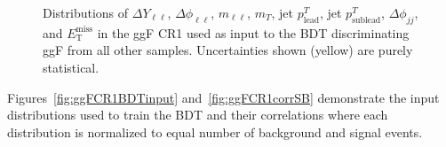 \begin{figure}[!h]
{  }\hfill
  \hfill
{\caption{Distributions of $\Delta Y_{\ell\ell}$, $\Delta \phi_{\ell\ell}$, $m_{\ell\ell}$, $m_T$, jet $p^T_{\text{lead}}$, jet $p^T_{\text{sublead}}$, $\Delta \phi_{jj}$, and $\ensuremath{E_{\text{T}}^{\text{miss}}}$ in the ggF CR1 used as input to the BDT discriminating ggF from all other samples. Uncertainties shown (yellow) are purely statistical.
\label{fig:ggFCR1}}}
\end{figure} 

Figures~\ref{fig:ggFCR1BDTinput} and~\ref{fig:ggFCR1corrSB} demonstrate the input distributions used to train the BDT and their correlations where each distribution is normalized to equal number of background and signal events. 

